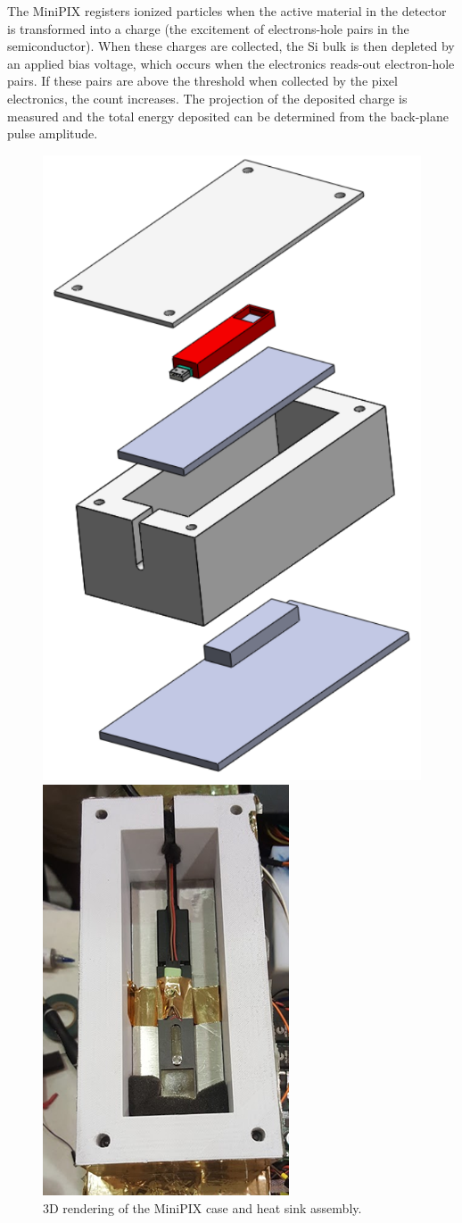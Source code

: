 The MiniPIX registers ionized particles when the active material in the detector is transformed into a charge (the excitement of electrons-hole pairs in the semiconductor). When these charges are collected, the Si bulk is then depleted by an applied bias voltage, which occurs when the electronics reads-out electron-hole pairs. If these pairs are above the threshold when collected by the pixel electronics, the count increases. The projection of the deposited charge is measured and the total energy deposited can be determined from the back-plane pulse amplitude. 

\begin{figure}[!h]
  \begin{minipage}[c]{0.49\linewidth}
    \includegraphics[scale=1, width=.5\textwidth]{Figures/Minipix_case_assembly.pdf}
    \caption{3D rendering of the MiniPIX case and heat sink assembly.} %
    \label{fig:case_assem}
  \end{minipage}
  \hfill
  \begin{minipage}[c]{0.49\linewidth}
    \centering
    \includegraphics[scale=1, width=.5\textwidth]{Figures/minipix_mounted.png}

\end{minipage}
\end{figure}
